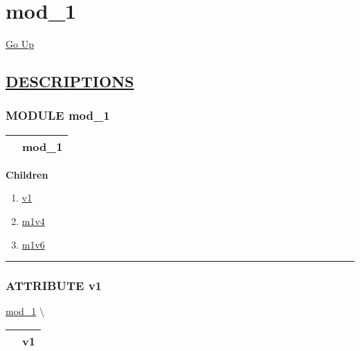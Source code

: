 \chapter*{\color{headfile}
mod_1
}
\hypertarget{ecldoc:toc:mod_1}{}
\hyperlink{ecldoc:toc:root}{Go Up}


\section*{\underline{\textsf{DESCRIPTIONS}}}
\subsection*{\textsf{\colorbox{headtoc}{\color{white} MODULE}
mod\_1}}

\hypertarget{ecldoc:mod_1}{}

{\renewcommand{\arraystretch}{1.5}
\begin{tabularx}{\textwidth}{|>{\raggedright\arraybackslash}l|X|}
\hline
\hspace{0pt}\mytexttt{\color{red} } & \textbf{mod\_1} \\
\hline
\end{tabularx}
}

\par


\textbf{Children}
\begin{enumerate}
\item \hyperlink{ecldoc:mod_1.v1}{v1}
\item \hyperlink{ecldoc:mod_1.m1v4}{m1v4}
\item \hyperlink{ecldoc:mod_1.m1v6}{m1v6}
\end{enumerate}

\rule{\linewidth}{0.5pt}

\subsection*{\textsf{\colorbox{headtoc}{\color{white} ATTRIBUTE}
v1}}

\hypertarget{ecldoc:mod_1.v1}{}
\hspace{0pt} \hyperlink{ecldoc:mod_1}{mod_1} \textbackslash 

{\renewcommand{\arraystretch}{1.5}
\begin{tabularx}{\textwidth}{|>{\raggedright\arraybackslash}l|X|}
\hline
\hspace{0pt}\mytexttt{\color{red} } & \textbf{v1} \\
\hline
\end{tabularx}
}


